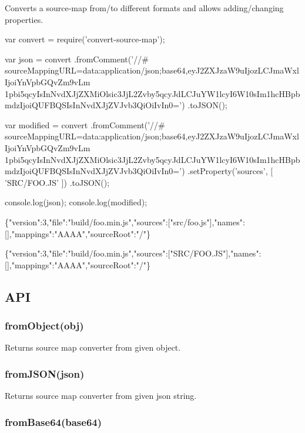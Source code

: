 \href{https://nodei.co/npm/convert-source-map/}{\tt }

Converts a source-\/map from/to different formats and allows adding/changing properties.


\begin{DoxyCode}
var convert = require('convert-source-map');

var json = convert
  .fromComment('//#
       sourceMappingURL=data:application/json;base64,eyJ2ZXJzaW9uIjozLCJmaWxlIjoiYnVpbGQvZm9vLm
      1pbi5qcyIsInNvdXJjZXMiOlsic3JjL2Zvby5qcyJdLCJuYW1lcyI6W10sIm1hcHBpbmdzIjoiQUFBQSIsInNvdXJjZVJvb3QiOiIvIn0=')
  .toJSON();

var modified = convert
  .fromComment('//#
       sourceMappingURL=data:application/json;base64,eyJ2ZXJzaW9uIjozLCJmaWxlIjoiYnVpbGQvZm9vLm
      1pbi5qcyIsInNvdXJjZXMiOlsic3JjL2Zvby5qcyJdLCJuYW1lcyI6W10sIm1hcHBpbmdzIjoiQUFBQSIsInNvdXJjZVJvb3QiOiIvIn0=')
  .setProperty('sources', [ 'SRC/FOO.JS' ])
  .toJSON();

console.log(json);
console.log(modified);
\end{DoxyCode}



\begin{DoxyCode}

      \{"version":3,"file":"build/foo.min.js","sources":["src/foo.js"],"names":[],"mappings":"AAAA","sourceRoot":"/"\}

      \{"version":3,"file":"build/foo.min.js","sources":["SRC/FOO.JS"],"names":[],"mappings":"AAAA","sourceRoot":"/"\}
\end{DoxyCode}


\subsection*{A\+PI}

\subsubsection*{from\+Object(obj)}

Returns source map converter from given object.

\subsubsection*{from\+J\+S\+O\+N(json)}

Returns source map converter from given json string.

\subsubsection*{from\+Base64(base64)}


